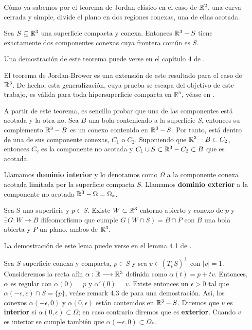 Cómo ya sabemos por el teorema de Jordan clásico en el caso de $\mathbb{R}^2$, una curva cerrada y simple, divide el plano en dos regiones conexas, una de ellas acotada.

\begin{theorem}
Sea $S \subseteq \mathbb{R}^3$ una superficie compacta y conexa. Entonces $\mathbb{R}^3 - S$ tiene exactamente dos componentes conexas cuya frontera común es $S$.
\end{theorem}

Una demostración de este teorema puede verse en el capítulo 4 de \cite{montielrosbook}.

El teorema de Jordan-Brower es una extensión de este resultado para el caso de $\mathbb{R}^3$. De hecho, esta generalización, cuya prueba se escapa del objetivo de este trabajo, es válida para toda hipersuperficie compacta en $\mathbb{R}^n$, véase en \cite{paperchicago}.

A partir de este teorema, es sencillo probar que una de las componentes está acotada y la otra no. Sea $B$ una bola conteniendo a la superficie $S$, entonces su complemento $\mathbb{R}^3 - B$ es un conexo contenido en $\mathbb{R}^3 - S$. Por tanto, está dentro de una de sus componente conexas, $C_1$ o $C_2$. Suponiendo que $\mathbb{R}^3 - B \subset C_2$, entonces $C_2$ es la componente no acotada y $C_1 \cup S \subset \mathbb{R}^3 - C_2 \subset B$ que es acotada. 

\begin{definition}
Llamamos \textbf{dominio interior} y lo denotamos como $\Omega$ a la componente conexa acotada limitada por la superficie compacta $S$. Llamamos \textbf{dominio exterior} a la componente no acotada $\mathbb{R}^3 - \Omega=\Omega_{*}$.
\end{definition}

\begin{lemma}
Sea S una superficie y $p \in S$. Existe $W \subset \mathbb{R}^3$ entorno abierto y conexo de $p$ y $\exists G: W \longrightarrow B$ difeomorfismo que cumple $G(W\cap S) = B\cap P$ con $B$ una bola abierta y $P$ un plano, ambos de $\mathbb{R}^3$.
\end{lemma}

La demostración de este lema puede verse en el lemma 4.1 de \cite{montielrosbook}.

\begin{definition}
Sea $S$ superficie conexa y compacta, $p \in S$ y sea $v \in (T_pS)^{\perp}$ con $|v|=1$. Consideremos la recta afín $\alpha: \mathbb{R} \longrightarrow \mathbb{R}^3$ definida como $\alpha(t) = p + tv$. Entonces, $\alpha$ es regular con $\alpha(0)=p$ y $\alpha'(0) = v$. Existe entonces un $\epsilon  >  0$ tal que $\alpha(-\epsilon, \epsilon) \cap S = \{p\}$, veáse remark 4.3 de \cite{montielrosbook} para una demostración. Así, los conexos $\alpha(-\epsilon, 0)$ y $\alpha(0, \epsilon)$ están contenidos en $\mathbb{R}^3 - S$. Diremos que $v$ es \textbf{interior} si $\alpha(0, \epsilon) \subset \Omega$; en caso contrario diremos que es \textbf{exterior}. Cuando $v$ es interior se cumple también que $\alpha(-\epsilon, 0) \subset \Omega_*$.
\end{definition}

